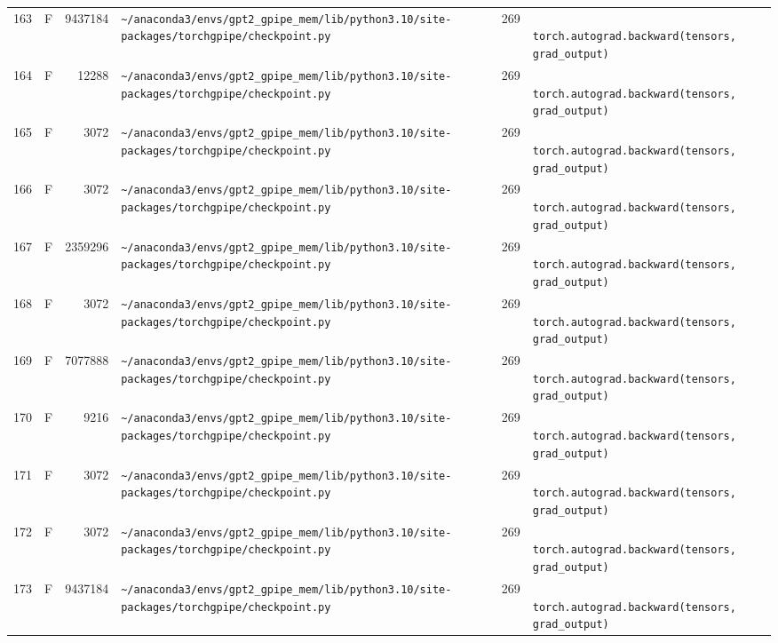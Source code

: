 \documentclass{article}
\begin{document}
\begin{longtable}{r l r p{6.5cm} r p{7.0cm}}
163 & F & 9437184 & \lstinline|~/anaconda3/envs/gpt2_gpipe_mem/lib/python3.10/site-packages/torchgpipe/checkpoint.py| & 269 & \lstinline|            torch.autograd.backward(tensors, grad_output)| \\
164 & F & 12288 & \lstinline|~/anaconda3/envs/gpt2_gpipe_mem/lib/python3.10/site-packages/torchgpipe/checkpoint.py| & 269 & \lstinline|            torch.autograd.backward(tensors, grad_output)| \\
165 & F & 3072 & \lstinline|~/anaconda3/envs/gpt2_gpipe_mem/lib/python3.10/site-packages/torchgpipe/checkpoint.py| & 269 & \lstinline|            torch.autograd.backward(tensors, grad_output)| \\
166 & F & 3072 & \lstinline|~/anaconda3/envs/gpt2_gpipe_mem/lib/python3.10/site-packages/torchgpipe/checkpoint.py| & 269 & \lstinline|            torch.autograd.backward(tensors, grad_output)| \\
167 & F & 2359296 & \lstinline|~/anaconda3/envs/gpt2_gpipe_mem/lib/python3.10/site-packages/torchgpipe/checkpoint.py| & 269 & \lstinline|            torch.autograd.backward(tensors, grad_output)| \\
168 & F & 3072 & \lstinline|~/anaconda3/envs/gpt2_gpipe_mem/lib/python3.10/site-packages/torchgpipe/checkpoint.py| & 269 & \lstinline|            torch.autograd.backward(tensors, grad_output)| \\
169 & F & 7077888 & \lstinline|~/anaconda3/envs/gpt2_gpipe_mem/lib/python3.10/site-packages/torchgpipe/checkpoint.py| & 269 & \lstinline|            torch.autograd.backward(tensors, grad_output)| \\
170 & F & 9216 & \lstinline|~/anaconda3/envs/gpt2_gpipe_mem/lib/python3.10/site-packages/torchgpipe/checkpoint.py| & 269 & \lstinline|            torch.autograd.backward(tensors, grad_output)| \\
171 & F & 3072 & \lstinline|~/anaconda3/envs/gpt2_gpipe_mem/lib/python3.10/site-packages/torchgpipe/checkpoint.py| & 269 & \lstinline|            torch.autograd.backward(tensors, grad_output)| \\
172 & F & 3072 & \lstinline|~/anaconda3/envs/gpt2_gpipe_mem/lib/python3.10/site-packages/torchgpipe/checkpoint.py| & 269 & \lstinline|            torch.autograd.backward(tensors, grad_output)| \\
173 & F & 9437184 & \lstinline|~/anaconda3/envs/gpt2_gpipe_mem/lib/python3.10/site-packages/torchgpipe/checkpoint.py| & 269 & \lstinline|            torch.autograd.backward(tensors, grad_output)| \\

\end{longtable}
\end{document}
